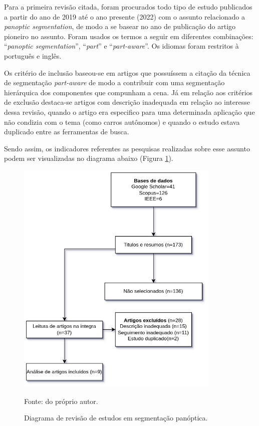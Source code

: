 Para a primeira revisão citada, foram procurados todo tipo de estudo publicados a partir do ano de 2019 até o ano presente (2022) com o assunto relacionado a \textit{panoptic segmentation}, de modo a se basear no ano de publicação do artigo pioneiro \cite{Kirillov2019a} no assunto. Foram usados os termos a seguir em diferentes combinações: ``\textit{panoptic segmentation}'', ``\textit{part}'' e ``\textit{part-aware}''. Os idiomas foram restritos à português e inglês.

Os critério de inclusão baseou-se em artigos que possuíssem a citação da técnica de segmentação \textit{part-aware} de modo a contribuir com uma segmentação hierárquica dos componentes que compunham a cena. Já em relação aos critérios de exclusão destaca-se artigos com descrição inadequada em relação ao interesse dessa revisão, quando o artigo era especifico para uma determinada aplicação que não condizia com o tema (como carros autônomos) e quando o estudo estava duplicado entre as ferramentas de busca.

Sendo assim, os indicadores referentes as pesquisas realizadas sobre esse assunto podem ser visualizadas no diagrama abaixo (Figura \ref{proposal:revision:fig:1}).

\begin{figure}[H]
    \centering
    \caption{Diagrama de revisão de estudos em segmentação panóptica.}
    \includegraphics[height=4.5in]{recursos/imagens/proposal/revisao_panoptica.png}
    \label{proposal:revision:fig:1}

    \vspace*{1 cm}
    Fonte: do próprio autor.
\end{figure}


